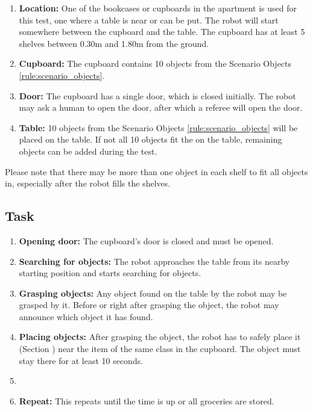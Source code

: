 \begin{enumerate}
\item \textbf{Location:} One of the bookcases or cupboards in the apartment is used for this test, one where a table is near or can be put. 
The robot will start somewhere between the cupboard and the table. 
The cupboard has at least 5 shelves between 0.30m and 1.80m from the ground. 
\item \textbf{Cupboard:} The cupboard contains 10 objects from the Scenario Objects \ref{rule:scenario_objects}.
\item \textbf{Door:} The cupboard has a single door, which is closed initially.
The robot may ask a human to open the door, after which a referee will open the door. 
\item \textbf{Table:} 10 objects from the Scenario Objects \ref{rule:scenario_objects} will be placed on the table. If not all 10 objects fit the on the table, remaining objects can be added during the test.
\end{enumerate}

Please note that there may be more than one object in each shelf to fit all objects in, especially after the robot fills the shelves. 

\subsection{Task}
\begin{enumerate}
\item \textbf{Opening door:} The cupboard's door is closed and must be opened.
\item \textbf{Searching for objects:} The robot approaches the table from its nearby starting position and starts searching for objects. 
\item \textbf{Grasping objects:} Any object found on the table by the robot may be grasped by it. 
  Before or right after grasping the object, the robot may announce which object it has found. 
\item \textbf{Placing objects:} After grasping the object, the robot has to safely place it (Section ) near the item of the same class in the cupboard. 
  The object must stay there for at least 10 seconds.
\item 
\item \textbf{Repeat:} This repeats until the time is up or all groceries are stored. 
\end{enumerate}

